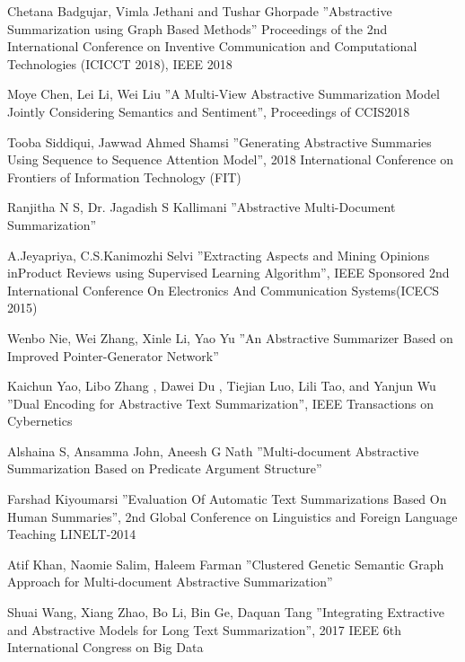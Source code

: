 \documentclass[11pt]{report}
\begin{document}
   
\begin{thebibliography}{999}


Chetana Badgujar, Vimla Jethani and Tushar Ghorpade ”Abstractive Summarization using Graph Based Methods” Proceedings of the 2nd International Conference on Inventive Communication and Computational Technologies (ICICCT 2018), IEEE 2018

Moye Chen, Lei Li, Wei Liu ”A Multi-View Abstractive Summarization Model Jointly Considering Semantics and Sentiment”, Proceedings of CCIS2018

Tooba Siddiqui, Jawwad Ahmed Shamsi ”Generating Abstractive Summaries Using Sequence to Sequence Attention Model”, 2018 International Conference on Frontiers of Information Technology (FIT)

Ranjitha N S, Dr. Jagadish S Kallimani ”Abstractive Multi-Document Summarization”

A.Jeyapriya, C.S.Kanimozhi Selvi ”Extracting Aspects and Mining Opinions inProduct Reviews using Supervised Learning Algorithm”, IEEE Sponsored 2nd International Conference On Electronics And Communication Systems(ICECS 2015)

Wenbo Nie, Wei Zhang, Xinle Li, Yao Yu ”An Abstractive Summarizer Based on Improved Pointer-Generator Network”

Kaichun Yao, Libo Zhang , Dawei Du , Tiejian Luo, Lili Tao, and Yanjun Wu ”Dual Encoding for Abstractive Text Summarization”, IEEE Transactions on Cybernetics

Alshaina S, Ansamma John, Aneesh G Nath ”Multi-document Abstractive Summarization Based on Predicate Argument Structure”

Farshad Kiyoumarsi ”Evaluation Of Automatic Text Summarizations Based On Human Summaries”, 2nd Global Conference on Linguistics and Foreign Language Teaching LINELT-2014

Atif Khan, Naomie Salim, Haleem Farman ”Clustered Genetic Semantic Graph Approach for Multi-document Abstractive Summarization”

Shuai Wang, Xiang Zhao, Bo Li, Bin Ge, Daquan Tang ”Integrating Extractive and Abstractive Models for Long Text Summarization”, 2017 IEEE 6th International Congress on Big Data


\end{thebibliography}
\end{document}
